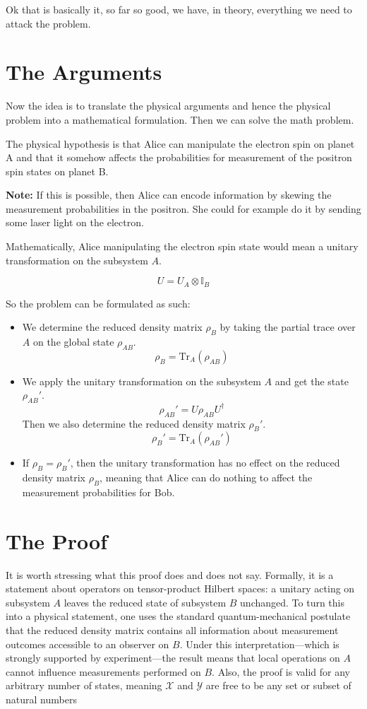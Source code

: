 \documentclass[11pt,a4paper]{article}
\newcommand{\note}[1]{%
  \par\medskip
  \noindent\textbf{Note:} #1
  \par\medskip
}
\begin{document}
Ok that is basically it, so far so good, we have, in theory, everything we need to attack the
problem.

\section{The Arguments}

Now the idea is to translate the physical arguments and hence the physical problem into a mathematical
formulation. Then we can solve the math problem.

The physical hypothesis is that Alice can manipulate the electron spin on planet A and that it somehow
affects the probabilities for measurement of the positron spin states on planet B.

\note{
  If this is possible, then Alice can encode information by skewing the measurement probabilities
  in the positron. She could for example do it by sending some laser light on the electron.
}

Mathematically, Alice manipulating the electron spin state would mean a unitary transformation
on the subsystem $A$.

\begin{equation}
  U = U_A \otimes \mathbb{I}_B
\end{equation}

So the problem can be formulated as such:
\begin{itemize}
  \item
    We determine the reduced density matrix $\rho_B$ by taking the partial trace over $A$
    on the global state $\rho_{AB}$.
    \[
      \rho_B = \mathrm{Tr}_{A}(\rho_{AB})
    \]
  \item
    We apply the unitary transformation on the subsystem $A$ and get the state $\rho_{AB}'$.
    \[
      \rho_{AB}' = U\rho_{AB}U^{\dagger}
    \]
    Then we also determine the reduced density matrix $\rho_B'$.
    \[
      \rho_B' = \mathrm{Tr}_{A}(\rho_{AB}')
    \]
  \item
    If $\rho_{B} = \rho_{B}'$, then the unitary transformation has no effect on the reduced
    density matrix $\rho_{B}$, meaning that Alice can do nothing to affect the measurement
    probabilities for Bob.
\end{itemize}

\section{The Proof}

It is worth stressing what this proof does and does not say. Formally, it is a statement about operators
on tensor-product Hilbert spaces: a unitary acting on subsystem $A$ leaves the reduced state of subsystem
$B$ unchanged. To turn this into a physical statement, one uses the standard quantum-mechanical postulate
that the reduced density matrix contains all information about measurement outcomes accessible to an observer
on $B$. Under this interpretation—which is strongly supported by experiment—the result means that local
operations on $A$ cannot influence measurements performed on $B$.
Also, the proof is valid for any arbitrary number of states, meaning $\mathcal{X}$ and $\mathcal{Y}$
are free to be any set or subset of natural numbers
\end{document}
